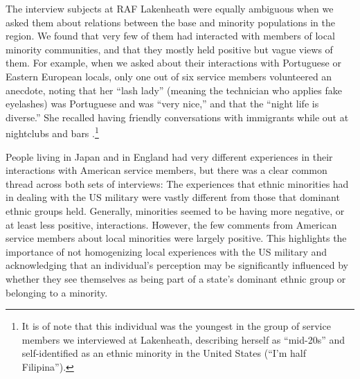 The interview subjects at RAF Lakenheath were equally ambiguous when we asked them about relations between the base and minority populations in the region. We found that very few of them had interacted with members of local minority communities, and that they mostly held positive but vague views of them. For example, when we asked about their interactions with Portuguese or Eastern European locals, only one out of six service members volunteered an anecdote, noting that her ``lash lady'' (meaning the technician who applies fake eyelashes) was Portuguese and was ``very nice,'' and that the ``night life is diverse.'' She recalled having friendly conversations with immigrants while out at nightclubs and bars \cite{raffive20190719}.\footnote{It is of note that this individual was the youngest in the group of service members we interviewed at Lakenheath, describing herself as ``mid-20s'' and self-identified as an ethnic minority in the United States (``I'm half Filipina'').} 

People living in Japan and in England had very different experiences in their interactions with American service members, but there was a clear common thread across both sets of interviews: The experiences that ethnic minorities had in dealing with the US military were vastly different from those that dominant ethnic groups held. Generally, minorities seemed to be having more negative, or at least less positive, interactions. However, the few comments from American service members about local minorities were largely positive. This highlights the importance of not homogenizing local experiences with the US military and acknowledging that an individual's perception may be significantly influenced by whether they see themselves as being part of a state's dominant ethnic group or belonging to a minority. 


